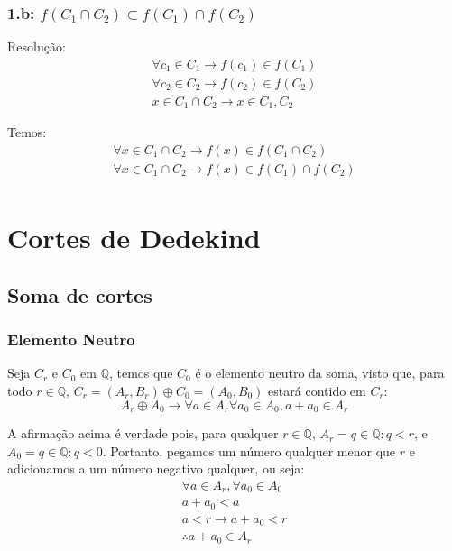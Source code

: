 \documentclass{article}
\begin{document}
    \subsubsection*{1.b: $f(C_1\cap C_2) \subset f(C_1)\cap
    f(C_2)$}
    Resolução:
    \begin{equation*}
        \begin{aligned}
            \forall c_1\in C_1 \rightarrow f(c_1)\in f(C_1) \\
            \forall c_2\in C_2 \rightarrow f(c_2)\in f(C_2) \\
            x\in C_1\cap C_2 \rightarrow x\in C_1, C_2
        \end{aligned}
    \end{equation*}

    Temos:
    \begin{equation*}
        \begin{aligned}
            \forall x\in C_1\cap C_2 \rightarrow f(x)\in
            f(C_1\cap C_2) \\
            \forall x\in C_1\cap C_2 \rightarrow f(x)\in
            f(C_1)\cap f(C_2) \\
        \end{aligned}
    \end{equation*}

    \section{Cortes de Dedekind}
    \subsection{Soma de cortes}
    \subsubsection*{Elemento Neutro}
    Seja $C_r$ e $C_0$ em $\mathbb{Q}$, temos que $C_0$ é o 
    elemento neutro da soma, visto que, para todo
    $r\in\mathbb{Q}$, $C_r = (A_r, B_r) \oplus C_0 = (A_0, B_0)$
    estará contido em $C_r$:
    \begin{equation*}
        A_r\oplus A_0 \rightarrow \forall a\in A_r \forall a_0\in
        A_0, a+a_0\in A_r
    \end{equation*}

    A afirmação acima é verdade pois, para qualquer
    $r\in\mathbb{Q}$, $A_r = {q\in\mathbb{Q} : q < r}$, e 
    $A_0 = {q\in\mathbb{Q} : q < 0}$. Portanto, pegamos
    um número qualquer menor que $r$ e adicionamos a um
    número negativo qualquer, ou seja:
    \begin{equation*}
        \begin{aligned}
            \forall a\in A_r, \forall a_0\in A_0 \\
            a + a_0 < a \\
            a < r \rightarrow a + a_0 < r \\
            \therefore a + a_0\in A_r
        \end{aligned}
    \end{equation*}
\end{document}
